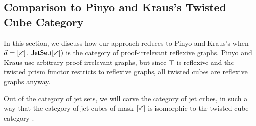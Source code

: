 \documentclass[a4paper]{memoir}
\begin{document}
\subsection{Comparison to Pinyo and Kraus's Twisted Cube Category}
In this section, we discuss how our approach reduces to Pinyo and Kraus's \cite{pinyo-twisted} when $\vec a = [\ypolar]$.
$\jetset{[\ypolar]}$ is the category of proof-irrelevant reflexive graphs.
Pinyo and Kraus use arbitrary proof-irrelevant graphs, but since $\top$ is reflexive and the twisted prism functor \cite[def.\ 4]{pinyo-twisted} restricts to reflexive graphs, all twisted cubes are reflexive graphs anyway.


Out of the category of jet sets, we will carve the category of jet cubes, in such a way that the category of jet cubes of mask $[\ypolar]$ is isomorphic to the twisted cube category \cite{pinyo-twisted}.




\end{document}
